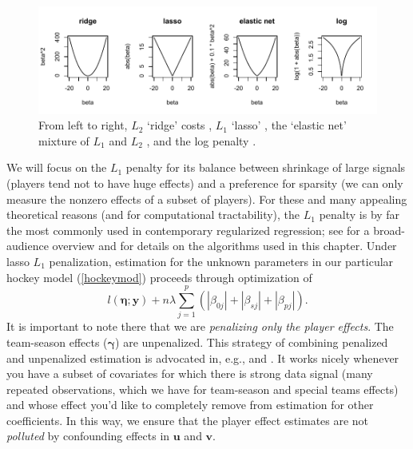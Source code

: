 \begin{figure}[t]
\includegraphics[width=\textwidth]{figures/penalties}
\caption{\label{costs} 
From left to right, 
$L_2$ `ridge' costs \cite{hoerl_ridge_1970}, $L_1$ `lasso' \cite{tibshirani_regression_1996}, the `elastic net' mixture of $L_1$ and $L_2$ \cite{zou_regularization_2005}, and the log penalty \cite{candes_enhancing_2008}.
}
\end{figure}

We will focus on the $L_1$ penalty for its balance between
shrinkage of large signals (players tend not to have huge effects) and a
preference for sparsity (we can only measure the nonzero effects of a subset
of players).  For these and many appealing theoretical reasons (and for
computational tractability), the $L_1$ penalty is by far the most commonly
used in contemporary regularized regression; see
\cite{hastie:tibsh:fried:2001} for a broad-audience overview and
\cite{taddy_one-step_2015} for details on the algorithms used in this chapter.
Under lasso $L_1$ penalization, estimation for the unknown parameters in 
our particular hockey model (\ref{hockeymod}) proceeds through optimization of
\begin{equation} \label{pendev}
l\left(\boldsymbol{\eta}; \mathbf{y}\right) + n\lambda \sum_{j=1}^p\left(|\beta_{0j}| + |\beta_{sj}| + |\beta_{pj}|\right).
\end{equation}
It is important to note there that we are \textit{penalizing only the player
effects}.  The team-season effects ($\boldsymbol{\gamma}$) are unpenalized.
This strategy of combining penalized and unpenalized estimation is advocated
in, e.g.,
\cite{taddy_distributed_2015} and \cite{gentzkow_measuring_2015}.  It works
nicely whenever you have a subset of covariates for which there is strong data
signal (many repeated observations, which we have for team-season and special
teams effects) and whose effect you'd like to completely remove from
estimation for other coefficients.  In this way, we ensure that the player
effect estimates are not \textit{polluted} by confounding effects in
$\mathbf{u}$ and $\mathbf{v}$.  

